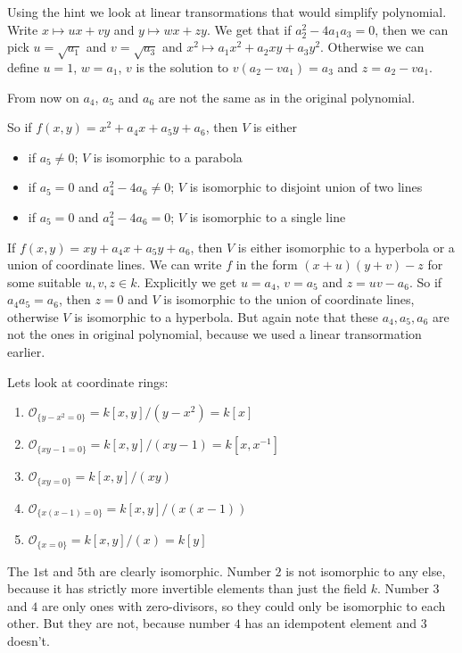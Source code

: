 \begin{exercise}{3}
    Using the hint we look at linear transormations that would simplify
    polynomial. Write $x \mapsto ux + vy$ and $y \mapsto wx + zy$. We get that
    if $a^2_2 - 4 a_1 a_3 = 0$, then we can pick $u = \sqrt{a_1}$ and $v =
    \sqrt{a_3}$ and $x^2 \mapsto a_1 x^2 + a_2 xy + a_3 y^2$. Otherwise we can
    define $u = 1$, $w = a_1$, $v$ is the solution to $v(a_2 - v a_1) = a_3$ and
    $z = a_2 - v a_1$.

    From now on $a_4$, $a_5$ and $a_6$ are not the same as in the original
    polynomial.

    So if $f(x, y) = x^2 + a_4 x + a_5 y + a_6$, then $V$ is either
    \begin{itemize}
        \item if $a_5 \not= 0$; $V$ is isomorphic to a parabola
        \item if $a_5 = 0$ and $a^2_4 - 4 a_6 \not= 0$; $V$ is isomorphic to disjoint union of two lines
        \item if $a_5 = 0$ and $a^2_4 - 4 a_6 = 0$; $V$ is isomorphic to a single line
    \end{itemize}

    If $f(x, y) = xy + a_4 x + a_5 y + a_6$, then $V$ is either isomorphic to a
    hyperbola or a union of coordinate lines. We can write $f$ in the form $(x +
    u) (y + v) - z$ for some suitable $u, v, z \in k$. Explicitly we get $u =
    a_4$, $v = a_5$ and $z = uv - a_6$. So if $a_4 a_5 = a_6$, then $z = 0$ and
    $V$ is isomorphic to the union of coordinate lines, otherwise $V$ is
    isomorphic to a hyperbola. But again note that these $a_4, a_5, a_6$ are not
    the ones in original polynomial, because we used a linear transormation
    earlier.
\end{exercise}

\begin{exercise}{4}
    Lets look at coordinate rings:
    \begin{enumerate}
        \item $\mathcal{O}_{\{y - x^2 = 0\}} = k[x, y] / (y - x^2) = k[x]$
        \item $\mathcal{O}_{\{xy - 1 = 0\}} = k[x, y] / (xy - 1) = k[x, x^{-1}]$
        \item $\mathcal{O}_{\{xy = 0\}} = k[x, y] / (xy)$
        \item $\mathcal{O}_{\{x(x - 1) = 0\}} = k[x, y] / (x(x - 1))$
        \item $\mathcal{O}_{\{x = 0\}} = k[x, y] / (x) = k[y]$
    \end{enumerate}
    The $1$st and $5$th are clearly isomorphic. Number $2$ is not isomorphic to
    any else, because it has strictly more invertible elements than just the
    field $k$. Number $3$ and $4$ are only ones with zero-divisors, so they
    could only be isomorphic to each other. But they are not, because number $4$
    has an idempotent element and $3$ doesn't.
\end{exercise}


